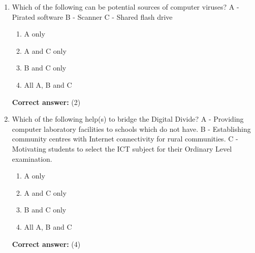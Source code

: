 \documentclass[12pt]{article}
\begin{document}
\begin{enumerate}[label=Q\arabic*:,leftmargin=*,resume]
\item Which of the following can be potential sources of computer viruses? A - Pirated software B - Scanner C - Shared flash drive\\
\begin{enumerate}[label=(\arabic*)]
\item A only
\item A and C only
\item B and C only
\item All A, B and C
\end{enumerate}
\textbf{Correct answer:} (2)

\item Which of the following help(s) to bridge the Digital Divide? A - Providing computer laboratory facilities to schools which do not have. B - Establishing community centres with Internet connectivity for rural communities. C - Motivating students to select the ICT subject for their Ordinary Level examination.\\
\begin{enumerate}[label=(\arabic*)]
\item A only
\item A and C only
\item B and C only
\item All A, B and C
\end{enumerate}
\textbf{Correct answer:} (4)
\end{enumerate}

\end{document}
